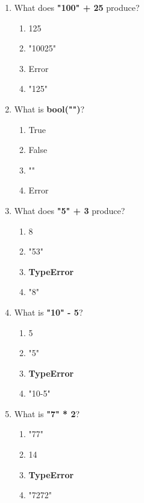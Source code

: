 \documentclass{article}
\begin{document}
\begin{multicols*}{4}
\begin{enumerate}
        \item What does \textbf{"100" + 25} produce?
        \begin{enumerate}[label=(\Alph*)]
            \item 125
            \item "10025"
            \item Error
            \item "125"
        \end{enumerate}

        \item What is \textbf{bool("")}?
        \begin{enumerate}[label=(\Alph*)]
            \item True
            \item False
            \item ""
            \item Error
        \end{enumerate}


        \item What does \textbf{"5" + 3} produce?
        \begin{enumerate}[label=(\Alph*)]
            \item 8
            \item "53"
            \item \textbf{TypeError}
            \item "8"
        \end{enumerate}

        \item What is \textbf{"10" - 5}?
        \begin{enumerate}[label=(\Alph*)]
            \item 5
            \item "5"
            \item \textbf{TypeError}
            \item "10-5"
        \end{enumerate}

        \item What is \textbf{"7" * 2}?
        \begin{enumerate}[label=(\Alph*)]
            \item "77"
            \item 14
            \item \textbf{TypeError}
            \item "7272"
        \end{enumerate}


\end{enumerate}
\end{multicols*}
\end{document}
